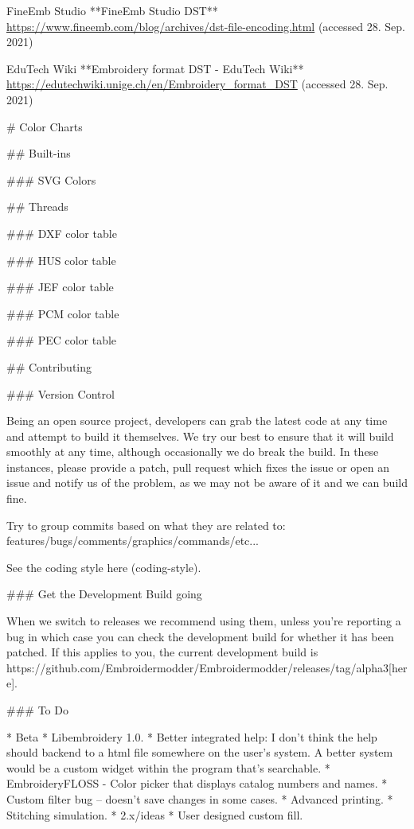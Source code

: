 FineEmb Studio
**FineEmb Studio \guillemotright DST**
\url{https://www.fineemb.com/blog/archives/dst-file-encoding.html}
(accessed 28. Sep. 2021)

EduTech Wiki
**Embroidery format DST - EduTech Wiki**
\url{https://edutechwiki.unige.ch/en/Embroidery_format_DST}
(accessed 28. Sep. 2021)

# Color Charts

## Built-ins

### SVG Colors

## Threads

### DXF color table

### HUS color table

### JEF color table

### PCM color table

### PEC color table

## Contributing

### Version Control

Being an open source project, developers can grab the latest code at any time
and attempt to build it themselves. We try our best to ensure that it will build smoothly
at any time, although occasionally we do break the build. In these instances,
please provide a patch, pull request which fixes the issue or open an issue and
notify us of the problem, as we may not be aware of it and we can build fine.

Try to group commits based on what they are related to: features/bugs/comments/graphics/commands/etc...

See the coding style  here (coding-style).

### Get the Development Build going

When we switch to releases we recommend using them, unless you're reporting a bug in which case you can check the development build for whether it has been patched. If this applies to you, the current development build is https://github.com/Embroidermodder/Embroidermodder/releases/tag/alpha3[here].

### To Do

* Beta
  * Libembroidery 1.0.
  * Better integrated help: I don't think the help should backend to a html file somewhere on the user's system. A better system would be a custom widget within the program that's searchable.
  * EmbroideryFLOSS - Color picker that displays catalog numbers and names.
  * Custom filter bug -- doesn't save changes in some cases.
  * Advanced printing.
  * Stitching simulation.
* 2.x/ideas
  * User designed custom fill.

